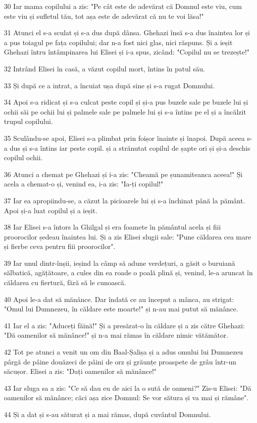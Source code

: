 \par 30 Iar mama copilului a zis: "Pe cât este de adevărat că Domnul este viu, cum este viu și sufletul tău, tot așa este de adevărat că nu te voi lăsa!"
\par 31 Atunci el s-a sculat și s-a dus după dânsa. Ghehazi însă s-a dus înaintea lor și a pus toiagul pe fața copilului; dar n-a fost nici glas, nici răspuns. Și a ieșit Ghehazi întru întâmpinarea lui Elisei și i-a spus, zicând: "Copilul nu se trezește!"
\par 32 Intrând Elisei în casă, a văzut copilul mort, întins în patul său.
\par 33 Și după ce a intrat, a încuiat ușa după sine și s-a rugat Domnului.
\par 34 Apoi s-a ridicat și s-a culcat peste copil și și-a pus buzele sale pe buzele lui și ochii săi pe ochii lui și palmele sale pe palmele lui și s-a întins pe el și a încălzit trupul copilului.
\par 35 Sculându-se apoi, Elisei s-a plimbat prin foișor înainte și înapoi. După aceea s-a dus și s-a întins iar peste copil. și a strănutat copilul de șapte ori și și-a deschis copilul ochii.
\par 36 Atunci a chemat pe Ghehazi și i-a zis: "Cheamă pe șunamiteanca aceea!" Și acela a chemat-o și, venind ea, i-a zis: "Ia-ți copilul!"
\par 37 Iar ea apropiindu-se, a căzut la picioarele lui și s-a închinat până la pământ. Apoi și-a luat copilul și a ieșit.
\par 38 Iar Elisei s-a întors la Ghilgal și era foamete în pământul acela și fiii proorocilor ședeau înaintea lui. Și a zis Elisei slugii sale: "Pune căldarea cea mare și fierbe ceva pentru fiii proorocilor".
\par 39 Iar unul dintr-înșii, ieșind la câmp să adune verdețuri, a găsit o buruiană sălbatică, agățătoare, a cules din ea roade o poală plină și, venind, le-a aruncat în căldarea cu fiertură, fără să le cunoască.
\par 40 Apoi le-a dat să mănânce. Dar îndată ce au început a mânca, au strigat: "Omul lui Dumnezeu, în căldare este moarte!" și n-au mai putut să mănânce.
\par 41 Iar el a zis: "Aduceți făină!" Și a presărat-o în căldare și a zis către Ghehazi: "Dă oamenilor să mănânce!" și n-a mai rămas în căldare nimic vătămător.
\par 42 Tot pe atunci a venit un om din Baal-Șalișa și a adus omului lui Dumnezeu pârgă de pâine douăzeci de pâini de orz și grăunțe proaspete de grâu într-un săcușor. Elisei a zis: "Dați oamenilor să mănânce!"
\par 43 Iar sluga sa a zis: "Ce să dau eu de aici la o sută de oameni?" Zis-u Elisei: "Dă oamenilor să mănânce; căci așa zice Domnul: Se vor sătura și va mai și rămâne".
\par 44 Și a dat și s-au săturat și a mai rămas, după cuvântul Domnului.

